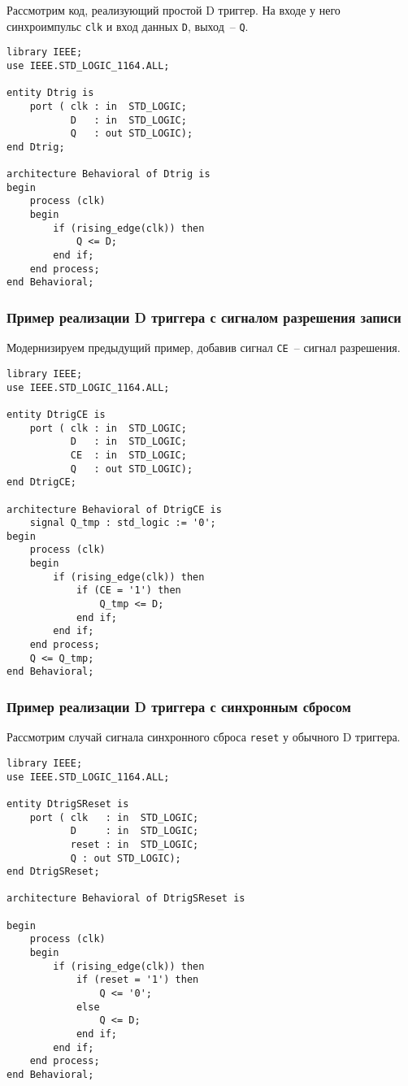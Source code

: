 Рассмотрим код, реализующий простой D триггер. На входе у него синхроимпульс \lstinline?clk? и вход данных \lstinline?D?, выход~-- \lstinline?Q?.

\begin{Code}
\begin{lstlisting}
library IEEE;
use IEEE.STD_LOGIC_1164.ALL;

entity Dtrig is
    port ( clk : in  STD_LOGIC;
           D   : in  STD_LOGIC;
           Q   : out STD_LOGIC);
end Dtrig;

architecture Behavioral of Dtrig is
begin
    process (clk)
    begin
        if (rising_edge(clk)) then
            Q <= D;
        end if;
    end process;
end Behavioral;
\end{lstlisting}
\end{Code}

\subsubsection{Пример реализации D триггера с сигналом разрешения записи}

Модернизируем предыдущий пример, добавив сигнал \lstinline?CE?~-- сигнал разрешения.

\begin{Code}
\begin{lstlisting}
library IEEE;
use IEEE.STD_LOGIC_1164.ALL;

entity DtrigCE is
    port ( clk : in  STD_LOGIC;
           D   : in  STD_LOGIC;
           CE  : in  STD_LOGIC;
           Q   : out STD_LOGIC);
end DtrigCE;

architecture Behavioral of DtrigCE is
    signal Q_tmp : std_logic := '0';
begin
    process (clk)
    begin
        if (rising_edge(clk)) then
            if (CE = '1') then
                Q_tmp <= D;
            end if;
        end if;
    end process;
    Q <= Q_tmp;
end Behavioral;
\end{lstlisting}
\end{Code}

\subsubsection{Пример реализации D триггера с синхронным сбросом}

Рассмотрим случай сигнала синхронного сброса \lstinline?reset? у обычного D триггера.

\begin{Code}
\begin{lstlisting}
library IEEE;
use IEEE.STD_LOGIC_1164.ALL;

entity DtrigSReset is
    port ( clk   : in  STD_LOGIC;
           D     : in  STD_LOGIC;
           reset : in  STD_LOGIC;
           Q : out STD_LOGIC);
end DtrigSReset;

architecture Behavioral of DtrigSReset is

begin
    process (clk)
    begin
        if (rising_edge(clk)) then
            if (reset = '1') then
                Q <= '0';
            else
                Q <= D;
            end if;
        end if;
    end process;
end Behavioral;
\end{lstlisting}
\end{Code}

